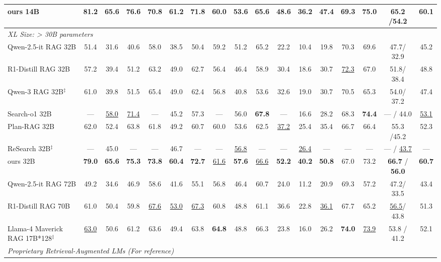 \begin{table}[t]
{\begin{tabular}{l @{\hskip2.5pt} | c c c | c c c | c c c | c c c | c | c @{\hskip3.5pt}| c @{\hskip6pt} c}
\rowcolor{teal!15}  ours 14B & \textbf{81.2} &\textbf{65.6} &\textbf{76.6} &\textbf{70.8} &\textbf{61.2} &\textbf{71.8} &\textbf{60.0} &\textbf{53.6} &\textbf{65.6} &\textbf{48.6} &\textbf{36.2} &\textbf{47.4} &\textbf{69.3} &\textbf{75.0} &\textbf{65.2} /\textbf{54.2} &\textbf{60.1}\\ \midrule
\multicolumn{10}{l}{\textit{XL Size: > 30B parameters}}  \\
\midrule
Qwen-2.5-it RAG 32B & 51.4 &31.6&40.6&58.0&38.5&50.4&59.2&51.2&65.2&22.2&10.4&19.8&70.3&69.6 &47.7/ 32.9&45.2 \\
R1-Distill RAG 32B & 57.2 &39.4 &51.2 &63.2 &49.0 & 62.7 &56.4 &46.4 &58.9 &30.4 &18.6 &30.7 &\underline{72.3} &67.0&51.8/ 38.4 &48.8 \\
Qwen-3 RAG 32B$^\ddagger$~\citep{qwen3} & 61.0 &39.8&51.5&65.4&49.0 & 62.4&56.8 &40.8 &53.6&32.6&19.0&30.7&70.5&65.3&54.0/ 37.2&47.4 \\
Search-o1 32B  \cite{li2025search}   & ---  & \underline{58.0}  & \underline{71.4} &  ---    & 45.2  & 57.3 & ---  & 56.0  & \textbf{67.8} & ---  & 16.6  & 28.2  & 68.3&\textbf{74.4} &--- / 44.0 &\underline{53.1} \\
Plan-RAG 32B~\citep{verma2025planrag} & 62.0&52.4&63.8&61.8&49.2&60.7&60.0&53.6&62.5&\underline{37.2}&25.4&35.4&66.7& 66.4&55.3 /45.2&52.3\\
ReSearch 32B$^\ddagger$~\citep{chen2025research} & --- &45.0 &--- &--- &46.7 &--- &--- &\underline{56.8} &--- &--- &\underline{26.4} &--- &--- &--- &--- /
\underline{43.7} &---\\
\rowcolor{blue!12}  ours 32B & \textbf{79.0} &\textbf{65.6}&\textbf{75.3}&\textbf{73.8}&\textbf{60.4}&\textbf{72.7}&\underline{61.6}&\textbf{57.6}&\underline{66.6}&\textbf{52.2}&\textbf{40.2}&\textbf{50.8}&67.0&73.2&\textbf{66.7} / \textbf{56.0}&\textbf{60.7} \\
Qwen-2.5-it RAG 72B & 49.2 &34.6 &46.9& 58.6& 41.6& 55.1 &56.8 &46.4&60.7 &24.0 &11.2&20.9& 69.3 &57.2 &47.2/ 33.5&43.4 \\
R1-Distill RAG 70B  & 61.0 &50.4 &59.8 & \underline{67.6} &\underline{53.0} &\underline{67.3} & 60.8 & 48.8 & 61.1 & 36.6 &22.8 &\underline{36.1} & 67.7 &65.2 &\underline{56.5}/ 43.8 & 51.3\\
Llama-4 Maverick RAG 17B*128$^\ddagger$ \citep{meta2025llama4} & \underline{63.0} &50.6 &61.2 &63.6& 49.4 &63.8& \textbf{64.8} &48.8& 66.3 &23.8 &16.0 &26.2 &\textbf{74.0} &\underline{73.9} & 53.8 / 41.2 & 52.1 \\
\midrule
\multicolumn{10}{l}{\textit{Proprietary Retrieval-Augmented LMs (For reference)}} \\

\end{tabular}}
\end{table}
